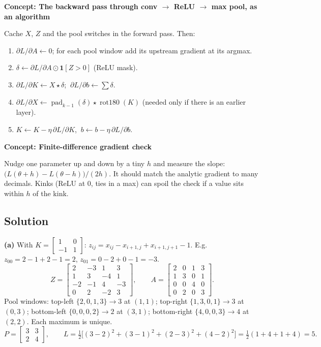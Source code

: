 \documentclass[12pt,a4paper]{article}
\newcommand{\concept}[2]{\par\medskip\phantomsection\label{#1}{\large\bfseries\color{blue!50!black} Concept: #2}\par}
\newcommand{\rot}{\operatorname{rot180}}
\begin{document}
\concept{c:cnnbackalg}{The backward pass through conv $\to$ ReLU $\to$ max pool, as an algorithm}
Cache $X$, $Z$ and the pool switches in the forward pass. Then:
\begin{enumerate}[nosep]
\item $\partial L/\partial A\leftarrow0$; for each pool window add its upstream gradient at its argmax.
\item $\delta\leftarrow\partial L/\partial A\odot\mathbf 1[Z>0]$ (ReLU mask).
\item $\partial L/\partial K\leftarrow X\star\delta$; $\ \partial L/\partial b\leftarrow\sum\delta$.
\item $\partial L/\partial X\leftarrow\operatorname{pad}_{k-1}(\delta)\star\rot(K)$ (needed only if there is an earlier layer).
\item $K\leftarrow K-\eta\,\partial L/\partial K$, $\ b\leftarrow b-\eta\,\partial L/\partial b$.
\end{enumerate}

\concept{c:fdcheck}{Finite-difference gradient check}
Nudge one parameter up and down by a tiny $h$ and measure the slope: $\bigl(L(\theta+h)-L(\theta-h)\bigr)/(2h)$. It should match the analytic gradient to many decimals. Kinks (ReLU at 0, ties in a max) can spoil the check if a value sits within $h$ of the kink.

\subsection*{Solution}
\textbf{(a)} With $K=\begin{bmatrix}1&0\\-1&1\end{bmatrix}$: $z_{ij}=x_{ij}-x_{i+1,j}+x_{i+1,j+1}-1$. E.g.\ $z_{00}=2-1+2-1=2$, $z_{01}=0-2+0-1=-3$.
\[
Z=\begin{bmatrix}2&-3&1&3\\1&3&-4&1\\-2&-1&4&-3\\0&2&-2&3\end{bmatrix},\qquad
A=\begin{bmatrix}2&0&1&3\\1&3&0&1\\0&0&4&0\\0&2&0&3\end{bmatrix}.
\]
Pool windows: top-left $\{2,0,1,3\}\to3$ at $(1,1)$; top-right $\{1,3,0,1\}\to3$ at $(0,3)$; bottom-left $\{0,0,0,2\}\to2$ at $(3,1)$; bottom-right $\{4,0,0,3\}\to4$ at $(2,2)$. Each maximum is unique.
\[
P=\begin{bmatrix}3&3\\2&4\end{bmatrix},\qquad L=\tfrac12\bigl[(3-2)^2+(3-1)^2+(2-3)^2+(4-2)^2\bigr]=\tfrac12(1+4+1+4)=5 .
\]
\end{document}
